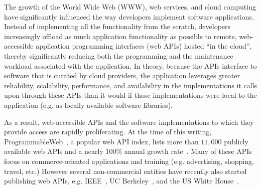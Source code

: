 The growth of the World Wide Web (WWW), web services, and cloud computing have
significantly influenced the way developers implement software applications.
Instead of implementing all the functionality from the scratch, developers
increasingly offload as much application functionality as possible to remote,
web-accessible application programming interfaces (web APIs) hosted ``in the
cloud'', thereby significantly reducing both the programming and
the maintenance workload associated with the application.  In theory, because
the APIs interface to software that is curated by cloud providers, the
application leverages greater
reliability, scalability, performance, 
and availability in the implementations it calls upon through these APIs than
it would if those implementations were local to the application
(e.g. as locally available software libraries).


As a result, web-accessible APIs and the software implementations to which
they provide access are rapidly proliferating.
At the time of this writing, 
ProgrammableWeb~\cite{pweb}, a popular web API index, lists more than $11,000$
publicly available
web APIs and a nearly 100\% annual growth rate~\cite{pweb_growth}. 
Many of these APIs focus on commerce-oriented applications and training (e.g.
advertising, shopping, travel, etc.)
However several non-commercial entities have recently
also started publishing web 
APIs, e.g. IEEE~\cite{ieeeapis}, UC Berkeley~\cite{ucbapis}, and the US White
House~\cite{whitehouseapis}.  %

